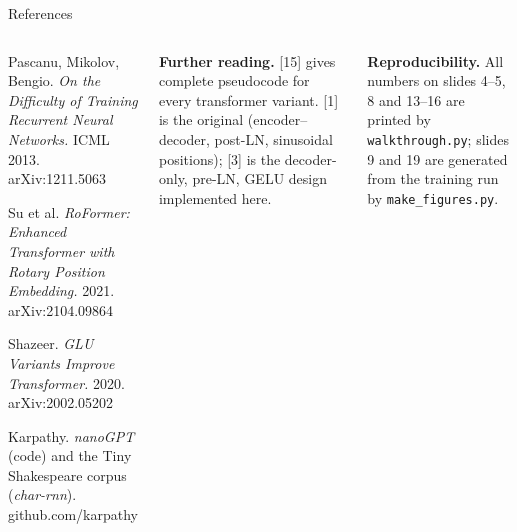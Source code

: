\documentclass[aspectratio=169,10pt]{beamer}
\begin{document}
\begin{frame}{References}
\begin{columns}[T,onlytextwidth]
\begin{enumerate}[{[1]}]
\item Pascanu, Mikolov, Bengio. \emph{On the Difficulty of Training Recurrent Neural Networks.} ICML 2013. arXiv:1211.5063
\item Su et al. \emph{RoFormer: Enhanced Transformer with Rotary Position Embedding.} 2021. arXiv:2104.09864
\item Shazeer. \emph{GLU Variants Improve Transformer.} 2020. arXiv:2002.05202
\item Karpathy. \emph{nanoGPT} (code) and the Tiny Shakespeare corpus (\emph{char-rnn}). github.com/karpathy
\end{enumerate}

\vspace{2mm}
{\fontsize{7}{8.6}\selectfont\color{cInk}
\textbf{Further reading.} [15] gives complete pseudocode for every transformer variant.
[1] is the original (encoder--decoder, post-LN, sinusoidal positions); [3] is the decoder-only,
pre-LN, GELU design implemented here.

\vspace{1mm}
\textbf{Reproducibility.} All numbers on slides 4--5, 8 and 13--16 are printed by
\texttt{walkthrough.py}; slides 9 and 19 are generated from the training run by
\texttt{make\_figures.py}.}
\end{columns}
\end{frame}
\end{document}
